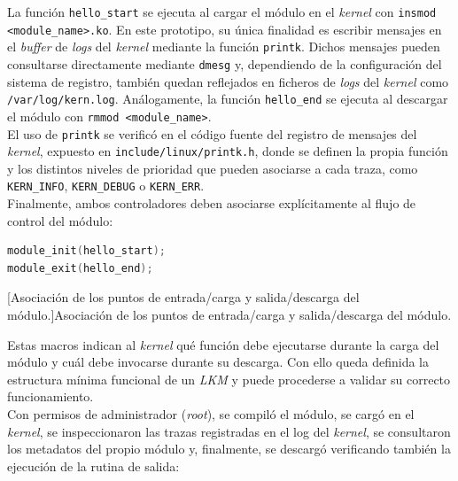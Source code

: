 La función \verb|hello_start| se ejecuta al cargar el módulo en el \textit{kernel} con \verb|insmod <module_name>.ko|. En este prototipo, su única finalidad es escribir mensajes en el \textit{buffer} de \textit{logs} del \textit{kernel} mediante la función \verb|printk|.
Dichos mensajes pueden consultarse directamente mediante \verb|dmesg| y, dependiendo de la configuración del sistema de registro, también quedan reflejados en ficheros de \textit{logs} del \textit{kernel} como \texttt{/var/log/kern.log}.
Análogamente, la función \verb|hello_end| se ejecuta al descargar el módulo con \verb|rmmod <module_name>|.\\
El uso de \verb|printk| se verificó en el código fuente del registro de mensajes del \textit{kernel}, expuesto en \texttt{include/linux/printk.h}, donde se definen la propia función y los distintos niveles de prioridad que pueden asociarse a cada traza, como \verb|KERN_INFO|, \verb|KERN_DEBUG| o \verb|KERN_ERR|.\\

Finalmente, ambos controladores deben asociarse explícitamente al flujo de control del módulo:

\begin{lstlisting}[language=C]
module_init(hello_start);
module_exit(hello_end);
\end{lstlisting}
\captionsetup{type=code,justification=centering,singlelinecheck=false}
[Asociación de los puntos de entrada/carga y salida/descarga del módulo.]{Asociación de los puntos de entrada/carga y salida/descarga del módulo.}
\label{cod:hello_module_init}
\vspace{\baselineskip}

Estas macros indican al \textit{kernel} qué función debe ejecutarse durante la carga del módulo y cuál debe invocarse durante su descarga.
Con ello queda definida la estructura mínima funcional de un \textit{LKM} y puede procederse a validar su correcto funcionamiento.\\

Con permisos de administrador (\textit{root}), se compiló el módulo, se cargó en el \textit{kernel}, se inspeccionaron las trazas registradas en el log del \textit{kernel}, se consultaron los metadatos del propio módulo y, finalmente, se descargó verificando también la ejecución de la rutina de salida:

